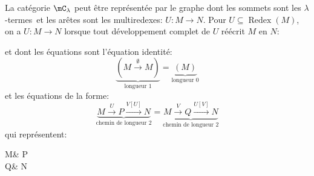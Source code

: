 \documentclass[math, info]{cours}
\def\lambdatermes{$\lambda$-termes\ }
\DeclareMathOperator{\Redex}{Redex}
\begin{document}
\begin{proposition}
	La catégorie $\clam$ peut être représentée par le graphe dont les sommets sont les \lambdatermes et les arêtes sont les multiredexes: $U: M \to N$.
	Pour $U \subseteq \Redex(M)$, on a $U: M\to N$ lorsque tout développement complet de $U$ réécrit $M$ en $N$:
	\begin{category}
	\end{category}
	et dont les équations sont l'équation identité:
	\begin{equation*}
		\underbrace{\left( M \xrightarrow{\emptyset} M\right)}_{\text{longueur 1}} = \underbrace{(M)}_{\text{longueur 0}}
	\end{equation*}
	et les équations de la forme:
	\begin{equation*}
		\underbrace{M\xrightarrow{U} P \xrightarrow{V[U]} N}_{\text{chemin de longueur 2}} = \underbrace{M \xrightarrow{V} Q \xrightarrow{U[V]} N}_{\text{chemin de longueur 2}}
	\end{equation*}
	qui représentent:
	\begin{category}
		M\ar[r, "U"]\ar[d, "V"] & P\ar[d, "V\{U\}"]\\
		Q\ar[r, "U\{V\}"] & N
	\end{category}
	\label{prop:repr}
\end{proposition}
\end{document}
